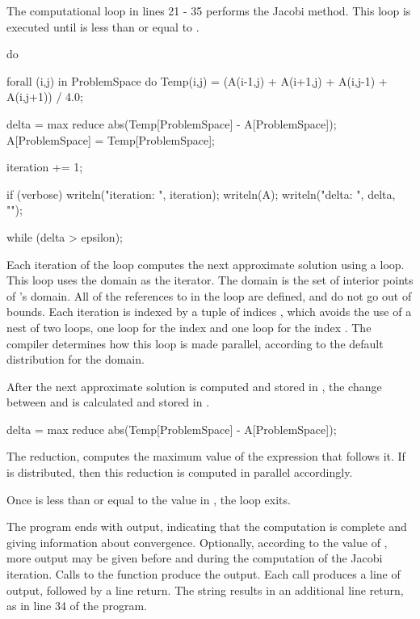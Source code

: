 The computational loop in lines 21 - 35 performs the Jacobi method.
This loop is executed until  is less than or equal to .
\begin{chapel}
  do {
    forall (i,j) in ProblemSpace do
      Temp(i,j) = (A(i-1,j) + A(i+1,j) + A(i,j-1) + A(i,j+1)) / 4.0;

    delta = max reduce abs(Temp[ProblemSpace] - A[ProblemSpace]);
    A[ProblemSpace] = Temp[ProblemSpace];

    iteration += 1;

    if (verbose) {
      writeln("iteration: ", iteration);
      writeln(A);
      writeln("delta: ", delta, "\n");
    }
  } while (delta > epsilon);
\end{chapel}
Each iteration of the  loop computes the next approximate
solution using a  loop.  This loop 
uses the  domain as the iterator.  The 
domain is the set of interior points of 's domain. 
All of the references to  in the loop are
defined, and do not go out of bounds.  Each iteration 
is indexed by a tuple of indices , which avoids the use of
a nest of two loops, one loop for the index  and one loop for the
index .  The compiler determines how this loop is made parallel, according
to the default distribution for the  domain.   

After the next approximate solution is computed and stored in ,
the change between  and  is calculated and stored in
.  
\begin{chapel}
    delta = max reduce abs(Temp[ProblemSpace] - A[ProblemSpace]);
\end{chapel}
The reduction, 
computes the maximum value of the expression that follows it.  If
 is distributed, then this reduction is computed in 
parallel accordingly.   

Once  is
less than or equal to the value in , the  loop 
exits.

The program ends with output, indicating that the computation is complete
and giving information about convergence.  Optionally, according to the
value of , more output may be given before and during the
computation of the Jacobi iteration.  Calls to the function 
produce the output.  Each  call
produces a line of output, followed by a line return.  The string 
results in  an additional line return, as in line 34 of the program.

